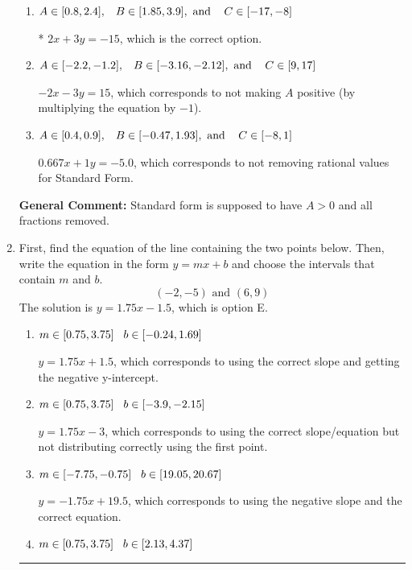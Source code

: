\documentclass{extbook}[14pt]
\newcommand{\litem}[1]{\item #1

\rule{\textwidth}{0.4pt}}
\begin{document}
\begin{enumerate}
{\begin{enumerate}[label=\Alph*.]
 $2x - 3y = 15$, which corresponds to using the opposite (negative) slope of the graph, but did everything else correctly.
\item \( A \in [0.8, 2.4], \hspace{3mm} B \in [1.85, 3.9], \text{ and } \hspace{3mm} C \in [-17, -8] \)

* $2x + 3y = -15$, which is the correct option.
\item \( A \in [-2.2, -1.2], \hspace{3mm} B \in [-3.16, -2.12], \text{ and } \hspace{3mm} C \in [9, 17] \)

 $-2x - 3y = 15$, which corresponds to not making $A$ positive (by multiplying the equation by $-1$).
\item \( A \in [0.4, 0.9], \hspace{3mm} B \in [-0.47, 1.93], \text{ and } \hspace{3mm} C \in [-8, 1] \)

 $0.667x + 1y = -5.0$, which corresponds to not removing rational values for Standard Form.
\end{enumerate}

\textbf{General Comment:} Standard form is supposed to have $A > 0$ and all fractions removed.
}
\litem{
First, find the equation of the line containing the two points below. Then, write the equation in the form $ y=mx+b $ and choose the intervals that contain $m$ and $b$.
\[ (-2, -5) \text{ and } (6, 9) \]The solution is \( y = 1.75x -1.5 \), which is option E.\begin{enumerate}[label=\Alph*.]
\item \( m \in [0.75, 3.75] \hspace*{3mm} b \in [-0.24, 1.69] \)

 $y = 1.75x + 1.5$, which corresponds to using the correct slope and getting the negative y-intercept.
\item \( m \in [0.75, 3.75] \hspace*{3mm} b \in [-3.9, -2.15] \)

 $y = 1.75x -3$, which corresponds to using the correct slope/equation but not distributing correctly using the first point.
\item \( m \in [-7.75, -0.75] \hspace*{3mm} b \in [19.05, 20.67] \)

 $y = -1.75x + 19.5$, which corresponds to using the negative slope and the correct equation.
\item \( m \in [0.75, 3.75] \hspace*{3mm} b \in [2.13, 4.37] \)


\end{enumerate}}
\end{enumerate}
\end{document}
